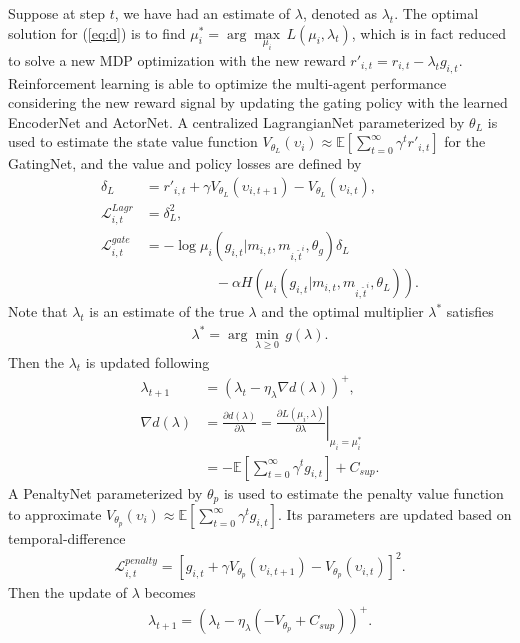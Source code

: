 \documentclass[letterpaper]{article} %
\begin{document}
Suppose at step $t$, we have had an estimate of $\lambda$, denoted as $\lambda_t$. The optimal solution for (\ref{eq:d}) is to find $\mu_i^*=\arg\underset{\mu_{i}}{\max}\, L(\mu_{i},\lambda_t)$,
which is in fact reduced to solve a new MDP optimization with the new reward $r'_{i,t}=r_{i,t}-\lambda_t g_{i,t}$.
Reinforcement learning is able to optimize the multi-agent performance considering the new reward signal by updating the gating policy with the learned EncoderNet and ActorNet.
A centralized LagrangianNet parameterized by $\theta_L$ is used to estimate the state value function $V_{\theta_L}(\upsilon_{i}) \approx \mathbb{E}\left[ \sum_{t=0}^\infty \gamma^t r'_{i,t} \right]$ for the GatingNet, and the value and policy losses are defined by
\begin{align}
\delta_L & = r'_{i,t} + \gamma V_{\theta_L}(\upsilon_{i,t+1}) - V_{\theta_L}(\upsilon_{i,t}), \\
\mathcal{L}_{i,t}^{Lagr} & = \delta_L ^2, \\
\mathcal{L}_{i,t}^{gate} & = -\log{\mu_{i}(g_{i,t}|m_{i,t}, m_{i,\hat{t}^i},\theta_g)}\delta_L \nonumber \\
& \qquad \qquad \quad - \alpha H(\mu_{i}(g_{i,t}|m_{i,t}, m_{i,\hat{t}^i},\theta_L)).
\end{align}
Note that $\lambda_t$ is an estimate of the true $\lambda$ and the optimal multiplier $\lambda^*$ satisfies
\begin{equation} \label{eq:lambda_star}
\begin{split}
\lambda^* = \arg\underset{\lambda \ge 0}{\min}\, g(\lambda).
\end{split}
\end{equation}
Then the $\lambda_t$ is updated following
\begin{align}
\lambda_{t+1} & = (\lambda_{t}-\eta_{\lambda} \nabla d(\lambda))^+ , \\
\nabla d(\lambda) & =\frac{\partial d(\lambda)}{\partial \lambda}=\left.\frac{\partial L\left(\mu_{i}, \lambda\right)}{\partial \lambda}\right|_{\mu_{i}=\mu_i^*} \nonumber \\
&=-\mathbb{E}\left[\sum_{t=0}^{\infty} \gamma^{t} g_{i, t}\right]+C_{sup}.
\end{align}
A PenaltyNet parameterized by $\theta_p$ is used to estimate the penalty value function to approximate $V_{\theta_p}(\upsilon_{i}) \approx \mathbb{E}\left[ \sum_{t=0}^\infty \gamma^t g_{i,t} \right]$. Its parameters are updated based on temporal-difference
\begin{equation} \label{eq:penalty_g}
\begin{gathered}
\mathcal{L}_{i,t}^{penalty} = \left[ g_{i,t} + \gamma V_{\theta_p}(\upsilon_{i,t+1}) - V_{\theta_p}(\upsilon_{i,t}) \right]^2.
\end{gathered}
\end{equation}
Then the update of $\lambda$ becomes
\begin{equation}
\begin{split}
\lambda_{t+1} = (\lambda_{t}-\eta_{\lambda} (-V_{\theta_p}+C_{sup}))^+.
\end{split}
\end{equation}
\end{document}
